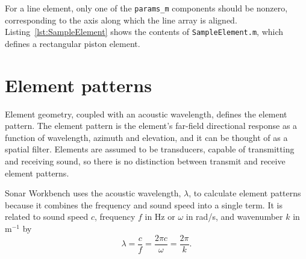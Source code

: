For a line element, only one of the \texttt{params\_m} components should be nonzero, corresponding to the axis along which the line array is aligned. Listing~\ref{lst:SampleElement} shows the contents of \texttt{SampleElement.m}, which defines a rectangular piston element.



\section{Element patterns}

Element geometry, coupled with an acoustic wavelength, defines the element pattern. The element pattern is the element's far-field directional response as a function of wavelength, azimuth and elevation, and it can be thought of as a spatial filter. Elements are assumed to be transducers, capable of transmitting and receiving sound, so there is no distinction between transmit and receive element patterns. 

Sonar Workbench uses the acoustic wavelength, $\lambda$, to calculate element patterns because it combines the frequency and sound speed into a single term. It is related to sound speed $c$, frequency $f$ in Hz or $\omega$ in rad/s, and wavenumber $k$ in m$^{-1}$ by
\begin{equation*}
\lambda = \frac{c}{f} = \frac{2\pi{c}}{\omega} = \frac{2\pi}{k}.
\end{equation*}

